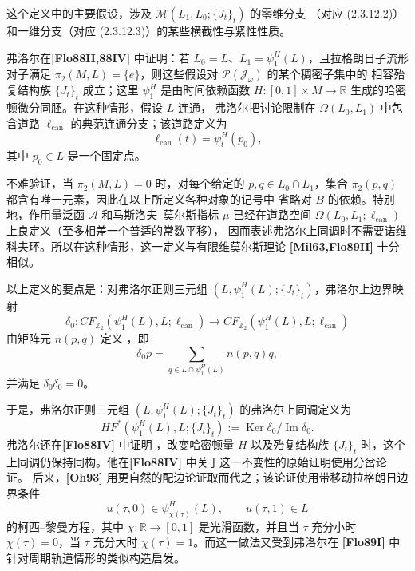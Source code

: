 这个定义中的主要假设，涉及 $\mathcal M(L_1,L_0;\{J_t\}_t)$ 的零维分支
（对应 (2.3.12.2)）和一维分支（对应 (2.3.12.3)）的某些横截性与紧性性质。

弗洛尔在\textbf{[Flo88II,88IV]} 中证明：若
$L_0=L$、$L_1=\psi_1^H(L)$，且拉格朗日子流形对子满足
$\pi_2(M,L)=\{e\}$，则这些假设对 $\mathcal P(\mathcal J_\omega)$ 的某个稠密子集中的
相容殆复结构族 $\{J_t\}_t$ 成立；这里 $\psi_1^H$ 是由时间依赖函数
$H:[0,1]\times M\to\mathbb R$ 生成的哈密顿微分同胚。在这种情形，假设 $L$ 连通，
弗洛尔把讨论限制在 $\Omega(L_0,L_1)$ 中包含道路 $\ell_{\mathrm{can}}$ 的典范连通分支；该道路定义为
\[
  \ell_{\mathrm{can}}(t)=\psi_t^H(p_0),
\]
其中 $p_0\in L$ 是一个固定点。

不难验证，当 $\pi_2(M,L)=0$ 时，对每个给定的
$p,q\in L_0\cap L_1$，集合 $\pi_2(p,q)$ 都含有唯一元素，因此在以上所定义各种对象的记号中
省略对 $B$ 的依赖。特别地，作用量泛函 $\mathcal A$ 和马斯洛夫--莫尔斯指标 $\mu$
已经在道路空间 $\Omega(L_0,L_1;\ell_{\mathrm{can}})$ 上良定义（至多相差一个普适的常数平移），
因而表述弗洛尔上同调时不需要诺维科夫环。所以在这种情形，这一定义与有限维莫尔斯理论
\textbf{[Mil63,Flo89II]} 十分相似。

以上定义的要点是：对弗洛尔正则三元组
$(L,\psi_1^H(L);\{J_t\}_t)$，弗洛尔上边界映射
\[
  \delta_0:CF_{\mathbb Z_2}(\psi_1^H(L),L;\ell_{\mathrm{can}})
  \longrightarrow
  CF_{\mathbb Z_2}(\psi_1^H(L),L;\ell_{\mathrm{can}})
\]
由矩阵元 $n(p,q)$ 定义
，即
\[
  \delta_0p
  =\sum_{q\in L\cap\psi_1^H(L)}n(p,q)q,
\]
并满足 $\delta_0\delta_0=0$。

于是，弗洛尔正则三元组
$(L,\psi_1^H(L);\{J_t\}_t)$ 的弗洛尔上同调定义为
\begin{equation}
  HF^*(\psi_1^H(L),L;\{J_t\}_t)
  :=\operatorname{Ker}\delta_0/\operatorname{Im}\delta_0.
  \tag{2.3.13}\label{eq:2-3-13}
\end{equation}
弗洛尔还在\textbf{[Flo88IV]} 中证明
，改变哈密顿量 $H$ 以及殆复结构族
$\{J_t\}_t$ 时，这个上同调仍保持同构。他在\textbf{[Flo88IV]} 中关于这一不变性的原始证明使用分岔论证。
后来，\textbf{[Oh93]} 用更自然的配边论证取而代之；该论证使用带移动拉格朗日边界条件
\[
  u(\tau,0)\in\psi_{\chi(\tau)}^H(L),
  \qquad
  u(\tau,1)\in L
\]
的柯西--黎曼方程，其中 $\chi:\mathbb R\to[0,1]$ 是光滑函数，并且当 $\tau$
充分小时 $\chi(\tau)=0$，当 $\tau$ 充分大时 $\chi(\tau)=1$。而这一做法又受到弗洛尔在
\textbf{[Flo89I]} 中针对周期轨道情形的类似构造启发。

